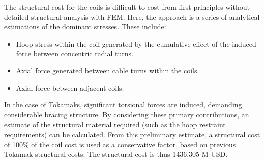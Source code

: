 The structural cost for the coils is difficult to cost from first principles without detailed structural analysis with FEM. Here, the approach is a series of analytical estimations of the dominant stresses. These include:

\begin{itemize}
    \item Hoop stress within the coil generated by the cumulative effect of the induced force between concentric radial turns.
    \item Axial force generated between cable turns within the coils. 
    \item Axial force between adjacent coils.
\end{itemize}


In the case of Tokamaks, significant torsional forces are induced, demanding considerable bracing structure. By considering these primary contributions, an estimate of the structural material required (such as the hoop restraint requirements) can be calculated. From this preliminary estimate, a structural cost of 100\% of the coil cost is used as a conservative factor, based on previous Tokamak structural costs. The structural cost is thus 1436.305 M USD.


